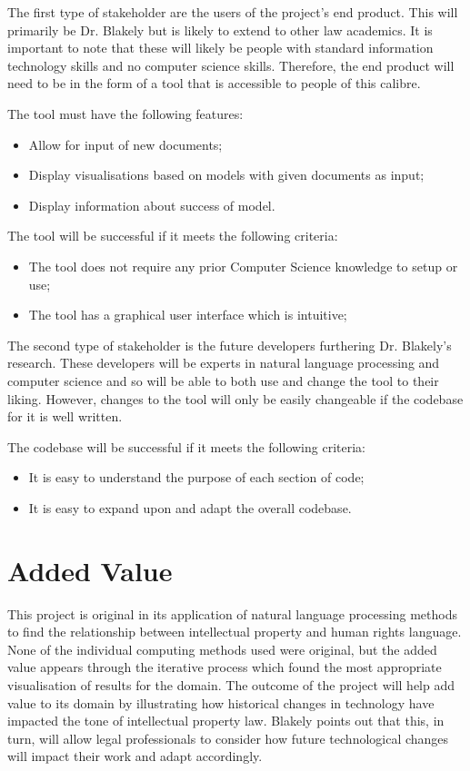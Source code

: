 			The first type of stakeholder are the users of the project's end product. This will primarily be Dr. Blakely but is likely to extend to other law academics. It is important to note that these will likely be people with standard information technology skills and no computer science skills. Therefore, the end product will need to be in the form of a tool that is accessible to people of this calibre.  

			The tool must have the following features: 
			\begin{itemize}
				\item Allow for input of new documents;
				\item Display visualisations based on models with given documents as input;
				\item Display information about success of model.
			\end{itemize}

			The tool will be successful if it meets the following criteria: 
			\begin{itemize}
				\item The tool does not require any prior Computer Science knowledge to setup or use;
				\item The tool has a graphical user interface which is intuitive; 
			\end{itemize}
			
			The second type of stakeholder is the future developers furthering Dr. Blakely's research. These developers will be experts in natural language processing and computer science and so will be able to both use and change the tool to their liking. However, changes to the tool will only be easily changeable if the codebase for it is well written. 

			The codebase will be successful if it meets the following criteria:
			\begin{itemize}
				\item It is easy to understand the purpose of each section of code;
				\item It is easy to expand upon and adapt the overall codebase.
			\end{itemize}

		\section{Added Value}
			This project is original in its application of natural language processing methods to find the relationship between intellectual property and human rights language. None of the individual computing methods used were original, but the added value appears through the iterative process which found the most appropriate visualisation of results for the domain. The outcome of the project will help add value to its domain by illustrating how historical changes in technology have impacted the tone of intellectual property law. Blakely points out that this, in turn, will allow legal professionals to consider how future technological changes will impact their work and adapt accordingly.